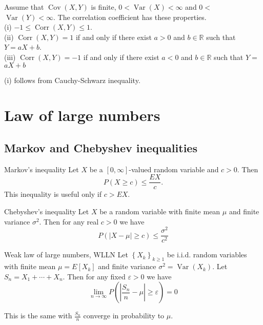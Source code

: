 \documentclass[11pt]{elegantbook}
\begin{document}
\begin{proposition}
Assume that $\operatorname{Cov}(X, Y)$ is finite, $0<\operatorname{Var}(X)<\infty$ and $0<$ $\operatorname{Var}(Y)<\infty$. The correlation coefficient has these properties.\\
(i) $-1 \leq \operatorname{Corr}(X, Y) \leq 1$.\\
(ii) $\operatorname{Corr}(X, Y)=1$ if and only if there exist $a>0$ and $b \in \mathbb{R}$ such that $Y=a X+b$.\\
(iii) $\operatorname{Corr}(X, Y)=-1$ if and only if there exist $a<0$ and $b \in \mathbb{R}$ such that $Y=$ $a X+b$
\end{proposition}
\begin{note}
    (i) follows from Cauchy-Schwarz inequality.
\end{note}

\chapter{Law of large numbers}
\section{Markov and Chebyshev inequalities}
\begin{lemma}{ Markov's inequality}
 Let $X$ be a $[0, \infty]$-valued random variable and $c>0$. Then
$$
P(X \geq c) \leq \frac{E X}{c} .
$$
This inequality is useful only if $c>E X$.
\end{lemma}

\begin{lemma}{Chebyshev's inequality}
 Let $X$ be a random variable with finite mean $\mu$ and finite variance $\sigma^2$. Then for any real $c>0$ we have
$$
P(|X-\mu| \geq c) \leq \frac{\sigma^2}{c^2}
$$
\end{lemma}

\begin{theorem}{  Weak law of large numbers, WLLN}
 Let $\left\{X_k\right\}_{k \geq 1}$ be i.i.d. random variables with finite mean $\mu=E\left[X_k\right]$ and finite variance ${\sigma^2}=\operatorname{Var}\left(X_k\right)$. Let $S_n=X_1+\cdots+X_n$. Then for any fixed $\varepsilon>0$ we have
$$
\lim _{n \rightarrow \infty} P\left(\left|\frac{S_n}{n}-\mu\right| \geq \varepsilon\right)=0
$$
\end{theorem}
\begin{note}
    This is the same with $\frac{S_n}{n}$ converge in probability to $\mu$.
\end{note}
\end{document}

